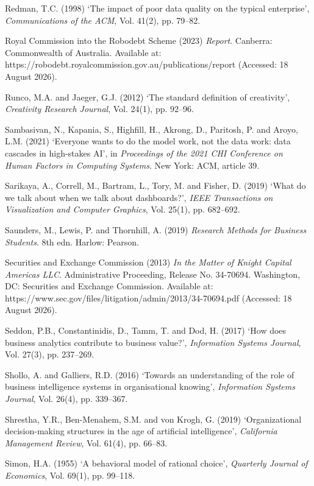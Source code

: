 \documentclass[12pt,a4paper]{article}
\begin{document}
{\rf Redman, T.C. (1998) `The impact of poor data quality on the typical enterprise', \emph{Communications of the ACM}, Vol. 41(2), pp. 79--82.

\rf Royal Commission into the Robodebt Scheme (2023) \emph{Report}. Canberra: Commonwealth of Australia. Available at: https://robodebt.royalcommission.gov.au/publications/report (Accessed: 18 August 2026).

\rf Runco, M.A. and Jaeger, G.J. (2012) `The standard definition of creativity', \emph{Creativity Research Journal}, Vol. 24(1), pp. 92--96.

\rf Sambasivan, N., Kapania, S., Highfill, H., Akrong, D., Paritosh, P. and Aroyo, L.M. (2021) `Everyone wants to do the model work, not the data work: data cascades in high-stakes AI', in \emph{Proceedings of the 2021 CHI Conference on Human Factors in Computing Systems}. New York: ACM, article 39.

\rf Sarikaya, A., Correll, M., Bartram, L., Tory, M. and Fisher, D. (2019) `What do we talk about when we talk about dashboards?', \emph{IEEE Transactions on Visualization and Computer Graphics}, Vol. 25(1), pp. 682--692.

\rf Saunders, M., Lewis, P. and Thornhill, A. (2019) \emph{Research Methods for Business Students}. 8th edn. Harlow: Pearson.

\rf Securities and Exchange Commission (2013) \emph{In the Matter of Knight Capital Americas LLC}. Administrative Proceeding, Release No. 34-70694. Washington, DC: Securities and Exchange Commission. Available at: https://www.sec.gov/files/litigation/admin/2013/34-70694.pdf (Accessed: 18 August 2026).

\rf Seddon, P.B., Constantinidis, D., Tamm, T. and Dod, H. (2017) `How does business analytics contribute to business value?', \emph{Information Systems Journal}, Vol. 27(3), pp. 237--269.

\rf Shollo, A. and Galliers, R.D. (2016) `Towards an understanding of the role of business intelligence systems in organisational knowing', \emph{Information Systems Journal}, Vol. 26(4), pp. 339--367.

\rf Shrestha, Y.R., Ben-Menahem, S.M. and von Krogh, G. (2019) `Organizational decision-making structures in the age of artificial intelligence', \emph{California Management Review}, Vol. 61(4), pp. 66--83.

\rf Simon, H.A. (1955) `A behavioral model of rational choice', \emph{Quarterly Journal of Economics}, Vol. 69(1), pp. 99--118.

}
\end{document}
